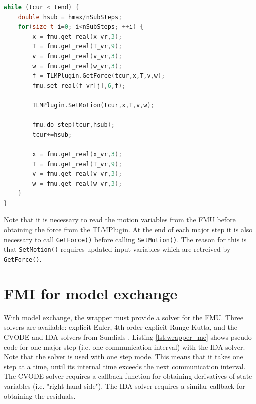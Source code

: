 \begin{lstlisting}[language=c++, basicstyle=\ttfamily\small,floatplacement=htb,caption=Pseudo code for the simulation loop with FMI for co-simulation,label=lst:wrapper_cs]
while (tcur < tend) {
    double hsub = hmax/nSubSteps;
    for(size_t i=0; i<nSubSteps; ++i) {
        x = fmu.get_real(x_vr,3);
        T = fmu.get_real(T_vr,9);
        v = fmu.get_real(v_vr,3);
        w = fmu.get_real(w_vr,3);
        f = TLMPlugin.GetForce(tcur,x,T,v,w);
        fmu.set_real(f_vr[j],6,f);
        
        TLMPlugin.SetMotion(tcur,x,T,v,w);

        fmu.do_step(tcur,hsub);
        tcur+=hsub;

        x = fmu.get_real(x_vr,3);
        T = fmu.get_real(T_vr,9);
        v = fmu.get_real(v_vr,3);
        w = fmu.get_real(w_vr,3);
    }
}
\end{lstlisting}

Note that it is necessary to read the motion variables from the FMU before obtaining the force from the TLMPlugin. 
At the end of each major step it is also necessary to call \texttt{GetForce()} before calling \texttt{SetMotion()}.
The reason for this is that \texttt{SetMotion()} requires updated input variables which are retreived by \texttt{GetForce()}.

\vspace{0cm}

\clearpage
\section{FMI for model exchange}
\label{sec:fmi_me}
With model exchange, the wrapper must provide a solver for the FMU.
Three solvers are available: explicit Euler, 4th order explicit Runge-Kutta, and the CVODE and IDA solvers from Sundials \cite{hindmarsh2005}.
Listing \ref{lst:wrapper_me} shows pseudo code for one major step (i.e. one communication interval) with the IDA solver.
Note that the solver is used with one step mode.
This means that it takes one step at a time, until its internal time exceeds the next communication interval.
The CVODE solver requires a callback function for obtaining derivatives of state variables (i.e. "right-hand side").
The IDA solver requires a similar callback for obtaining the residuals.

